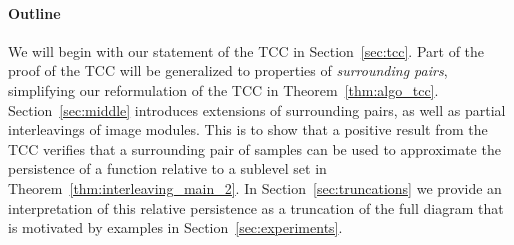 %
%
%

\paragraph*{Outline}

We will begin with our statement of the TCC in Section~\ref{sec:tcc}.
Part of the proof of the TCC will be generalized to properties of \emph{surrounding pairs}, simplifying our reformulation of the TCC in Theorem~\ref{thm:algo_tcc}.
Section~\ref{sec:middle} introduces extensions of surrounding pairs, as well as partial interleavings of image modules.
This is to show that a positive result from the TCC verifies that a surrounding pair of samples can be used to approximate the persistence of a function relative to a sublevel set in Theorem~\ref{thm:interleaving_main_2}.
In Section~\ref{sec:truncations} we provide an interpretation of this relative persistence as a truncation of the full diagram that is motivated by examples in Section~\ref{sec:experiments}.
